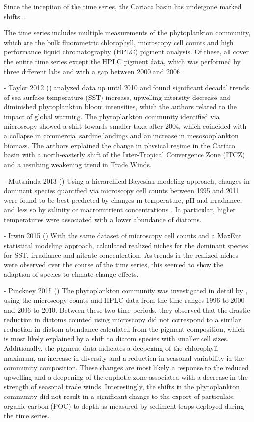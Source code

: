 \documentclass[draft]{agujournal2019}
\begin{document}
    Since the inception of the time series, the Cariaco basin has undergone marked shifts...

    The time series includes multiple measurements of the phytoplankton community, which are the bulk fluorometric chlorophyll, microscopy cell counts and high performance liquid chromatography (HPLC) pigment analysis. Of these, all cover the entire time series except the HPLC pigment data, which was performed by three different labs and with a gap between 2000 and 2006 \cite{muller-karger_scientific_2019}. 
    
    - Taylor 2012 ()
     analyzed data up until 2010 and found significant decadal trends of sea surface temperature (SST) increase, upwelling intensity decrease and diminished phytoplankton bloom intensities, which the authors related to the impact of global warming. The phytoplankton community identified via microscopy showed a shift towards smaller taxa after 2004, which coincided with a collapse in commercial sardine landings and an increase in mesozooplankton biomass. The authors explained the change in physical regime in the Cariaco basin with a north-easterly shift of the Inter-Tropical Convergence Zone (ITCZ) and a resulting weakening trend in Trade Winds.
    
    - Mutshinda 2013 ()
    Using a hierarchical Bayesian modeling approach, changes in dominant species quantified via microscopy cell counts between 1995 and 2011 were found to be best predicted by changes in temperature, pH and irradiance, and less so by salinity or macronutrient concentrations \cite{mutshinda_environmental_2013}. In particular, higher temperatures were associated with a lower abundance of diatoms. 
    
    - Irwin 2015 ()
    With the same dataset of microscopy cell counts and a MaxEnt statistical modeling approach,  calculated realized niches for the dominant species for SST, irradiance and nitrate concentration. As trends in the realized niches were observed over the course of the time series, this seemed to show the adaption of species to climate change effects. 
    
    - Pinckney 2015 ()
    The phytoplankton community was investigated in detail by , using the microscopy counts and HPLC data from the time ranges 1996 to 2000 and 2006 to 2010. Between these two time periods, they observed that the drastic reduction in diatoms counted using microscopy did not correspond to a similar reduction in diatom abundance calculated from the pigment composition, which is most likely explained by a shift to diatom species with smaller cell sizes. Additionally, the pigment data indicates a deepening of the chlorophyll maximum, an increase in diversity and a reduction in seasonal variability in the community composition. These changes are most likely a response to the reduced upwelling  and a deepening of the euphotic zone associated with a decrease in the strength of seasonal trade winds. Interestingly, the shifts in the phytoplankton community did not result in a significant change to the export of particulate organic carbon (POC) to depth as measured by sediment traps deployed during the time series. 
\end{document}

